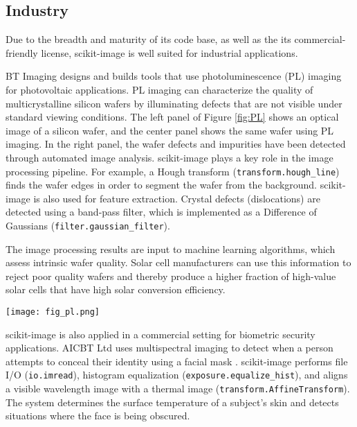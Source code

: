 
  \subsection*{Industry}
    \label{industry}

    Due to the breadth and maturity of its code base, as well as the its commercial-friendly license, scikit-image is well suited for industrial applications.

    BT Imaging \citep{BTImaging} designs and builds tools that use photoluminescence (PL) imaging for photovoltaic applications. PL imaging can characterize the quality of multicrystalline silicon wafers by illuminating defects that are not visible under standard viewing conditions. The left panel of Figure \ref{fig:PL} shows an optical image of a silicon wafer, and the center panel shows the same wafer using PL imaging. In the right panel, the wafer defects and impurities have been detected through automated image analysis. scikit-image plays a key role in the image processing pipeline. For example, a Hough transform (\texttt{transform.hough\_line}) finds the wafer edges in order to segment the wafer from the background. scikit-image is also used for feature extraction. Crystal defects (dislocations) are detected using a band-pass filter, which is implemented as a Difference of Gaussians (\texttt{filter.gaussian\_filter}).

    The image processing results are input to machine learning algorithms, which assess intrinsic wafer quality. Solar cell manufacturers can use this information to reject poor quality wafers and thereby produce a higher fraction of high-value solar cells that have high solar conversion efficiency.

    \begin{figure*}[bht]

      \texttt{[image: fig\_pl.png]}

      \caption{\textit{Left}: An image of an as-cut silicon wafer before it has been processed into a solar cell. \textit{Center}: A PL image of the same wafer. Wafer defects, which have a negative impact solar cell efficiency, are visible as dark regions. \textit{Right}: Image processing results. Defects in the crystal growth (dislocations) are colored blue, while red indicates the presence of impurities. \label{fig:PL}}
    \end{figure*}

    scikit-image is also applied in a commercial setting for biometric security applications. AICBT Ltd uses multispectral imaging to detect when a person attempts to conceal their identity using a facial mask \citep{AICBT}. scikit-image performs file I/O (\texttt{io.imread}), histogram equalization (\texttt{exposure.equalize\_hist}), and aligns a visible wavelength image with a thermal image (\texttt{transform.AffineTransform}). The system determines the surface temperature of a subject's skin and detects situations where the face is being obscured.
